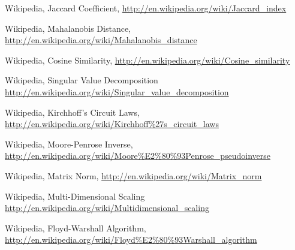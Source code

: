 	Wikipedia, Jaccard Coefficient, 
	\url{http://en.wikipedia.org/wiki/Jaccard_index}
	
	Wikipedia, Mahalanobis Distance, 
	\url{http://en.wikipedia.org/wiki/Mahalanobis_distance}
	
	Wikipedia, Cosine Similarity, 
	\url{http://en.wikipedia.org/wiki/Cosine_similarity}
	
	Wikipedia, Singular Value Decomposition
	\url{http://en.wikipedia.org/wiki/Singular_value_decomposition}
	
	Wikipedia, Kirchhoff's Circuit Laws, 
	\url{http://en.wikipedia.org/wiki/Kirchhoff%27s_circuit_laws}
	
	Wikipedia, Moore-Penrose Inverse, 
	\url{http://en.wikipedia.org/wiki/Moore%E2%80%93Penrose_pseudoinverse}
	
	Wikipedia, Matrix Norm, 
	\url{http://en.wikipedia.org/wiki/Matrix_norm}
	
	Wikipedia, Multi-Dimensional Scaling
	\url{http://en.wikipedia.org/wiki/Multidimensional_scaling}
	
	Wikipedia, Floyd-Warshall Algorithm, 
	\url{http://en.wikipedia.org/wiki/Floyd%E2%80%93Warshall_algorithm}
